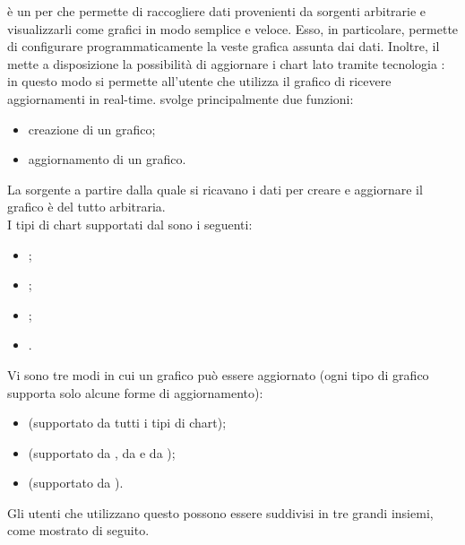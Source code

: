 		 è un  per  che permette di raccogliere dati provenienti da sorgenti arbitrarie e visualizzarli come grafici in modo semplice e veloce. Esso, in particolare, permette di configurare programmaticamente la veste grafica assunta dai dati. Inoltre, il  mette a disposizione la possibilità di aggiornare i chart lato  tramite tecnologia : in questo modo si permette all'utente che utilizza il grafico di ricevere aggiornamenti in real-time.
		 svolge principalmente due funzioni:
		\begin{itemize}
			\item creazione di un grafico;
			\item aggiornamento di un grafico.
		\end{itemize}
		La sorgente a partire dalla quale si ricavano i dati per creare e aggiornare il grafico è del tutto arbitraria.\\
		I tipi di chart supportati dal  sono i seguenti:
		\begin{itemize}
			\item {};
			\item {};
			\item {};
			\item {}.
		\end{itemize}
		Vi sono tre modi in cui un grafico può essere aggiornato (ogni tipo di grafico supporta solo alcune forme di aggiornamento):
		\begin{itemize}
			\item {} (supportato da tutti i tipi di chart);
			\item {} (supportato da , da  e da );
			\item {} (supportato da ).
		\end{itemize}
		Gli utenti che utilizzano questo  possono essere suddivisi in tre grandi insiemi, come mostrato di seguito.

